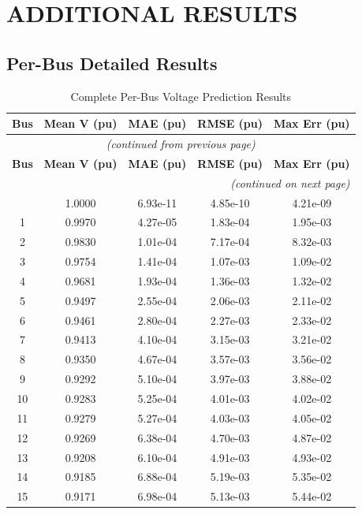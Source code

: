 \documentclass[12pt,a4paper]{report}
\begin{document}
\chapter{ADDITIONAL RESULTS}

\section{Per-Bus Detailed Results}

\begin{longtable}{ccccc}
\caption{Complete Per-Bus Voltage Prediction Results} \\
\toprule
\textbf{Bus} & \textbf{Mean V (pu)} & \textbf{MAE (pu)} & \textbf{RMSE (pu)} & \textbf{Max Err (pu)} \\
\midrule
\endfirsthead
\multicolumn{5}{c}{\textit{(continued from previous page)}} \\
\toprule
\textbf{Bus} & \textbf{Mean V (pu)} & \textbf{MAE (pu)} & \textbf{RMSE (pu)} & \textbf{Max Err (pu)} \\
\midrule
\endhead
\midrule
\multicolumn{5}{r}{\textit{(continued on next page)}} \\
\endfoot
\bottomrule
\endlastfoot
0 & 1.0000 & 6.93e-11 & 4.85e-10 & 4.21e-09 \\
1 & 0.9970 & 4.27e-05 & 1.83e-04 & 1.95e-03 \\
2 & 0.9830 & 1.01e-04 & 7.17e-04 & 8.32e-03 \\
3 & 0.9754 & 1.41e-04 & 1.07e-03 & 1.09e-02 \\
4 & 0.9681 & 1.93e-04 & 1.36e-03 & 1.32e-02 \\
5 & 0.9497 & 2.55e-04 & 2.06e-03 & 2.11e-02 \\
6 & 0.9461 & 2.80e-04 & 2.27e-03 & 2.33e-02 \\
7 & 0.9413 & 4.10e-04 & 3.15e-03 & 3.21e-02 \\
8 & 0.9350 & 4.67e-04 & 3.57e-03 & 3.56e-02 \\
9 & 0.9292 & 5.10e-04 & 3.97e-03 & 3.88e-02 \\
10 & 0.9283 & 5.25e-04 & 4.01e-03 & 4.02e-02 \\
11 & 0.9279 & 5.27e-04 & 4.03e-03 & 4.05e-02 \\
12 & 0.9269 & 6.38e-04 & 4.70e-03 & 4.87e-02 \\
13 & 0.9208 & 6.10e-04 & 4.91e-03 & 4.93e-02 \\
14 & 0.9185 & 6.88e-04 & 5.19e-03 & 5.35e-02 \\
15 & 0.9171 & 6.98e-04 & 5.13e-03 & 5.44e-02 \\

\end{longtable}
\end{document}
